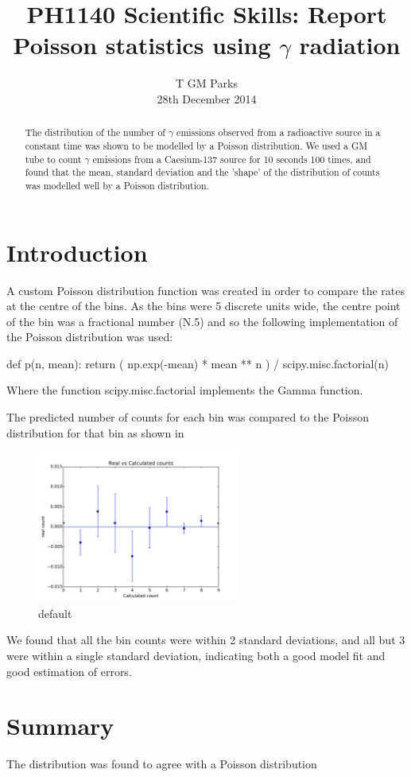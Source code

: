 \documentclass[10pt]{iopart}
\begin{document}
\title[PH1140 Report - T GM Parks]{PH1140 Scientific Skills: Report Poisson statistics using $\gamma$ radiation}

\author{T GM Parks\\28th December 2014}

\begin{abstract}
The distribution of the number of $\gamma$ emissions observed from a radioactive source in a constant time was shown to be modelled by a Poisson distribution. We used a GM tube to count $\gamma$ emissions from a Caesium-137 source for 10 seconds 100 times, and found that the mean, standard deviation and the 'shape' of the distribution of counts was modelled well by a Poisson distribution.
\end{abstract}


\section{Introduction}



A custom Poisson distribution function was created in order to compare the rates at the centre of the bins. As the bins were 5 discrete units wide, the centre point of the bin was a fractional number (N.5) and so the following implementation of the Poisson distribution was used:

def p(n, mean):
	return ( np.exp(-mean) * mean ** n ) / scipy.misc.factorial(n)

Where the function scipy.misc.factorial implements the Gamma function.

The predicted number of counts for each bin was compared to the Poisson distribution for that bin as shown in \begin{figure}[htbp]
\begin{center}
\includegraphics[height=5cm]{errorcomp.pdf}
\caption{default}
\label{default}
\end{center}
\end{figure}
 We found that all the bin counts were within 2 standard deviations, and all but 3 were within a single standard deviation, indicating both a good model fit and good estimation of errors.
    
\section{Summary}

The distribution was found to agree with a Poisson distribution 
\end{document}
